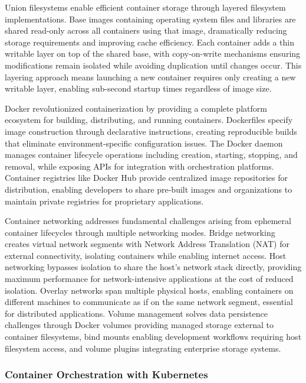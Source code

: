 \documentclass[a4paper, 12pt]{report}
\begin{document}
Union filesystems enable efficient container storage through layered filesystem implementations. Base images containing operating system files and libraries are shared read-only across all containers using that image, dramatically reducing storage requirements and improving cache efficiency. Each container adds a thin writable layer on top of the shared base, with copy-on-write mechanisms ensuring modifications remain isolated while avoiding duplication until changes occur. This layering approach means launching a new container requires only creating a new writable layer, enabling sub-second startup times regardless of image size.

Docker revolutionized containerization by providing a complete platform ecosystem for building, distributing, and running containers. Dockerfiles specify image construction through declarative instructions, creating reproducible builds that eliminate environment-specific configuration issues. The Docker daemon manages container lifecycle operations including creation, starting, stopping, and removal, while exposing APIs for integration with orchestration platforms. Container registries like Docker Hub provide centralized image repositories for distribution, enabling developers to share pre-built images and organizations to maintain private registries for proprietary applications.

Container networking addresses fundamental challenges arising from ephemeral container lifecycles through multiple networking modes. Bridge networking creates virtual network segments with Network Address Translation (NAT) for external connectivity, isolating containers while enabling internet access. Host networking bypasses isolation to share the host's network stack directly, providing maximum performance for network-intensive applications at the cost of reduced isolation. Overlay networks span multiple physical hosts, enabling containers on different machines to communicate as if on the same network segment, essential for distributed applications. Volume management solves data persistence challenges through Docker volumes providing managed storage external to container filesystems, bind mounts enabling development workflows requiring host filesystem access, and volume plugins integrating enterprise storage systems.

\subsubsection{Container Orchestration with Kubernetes}
\end{document}
